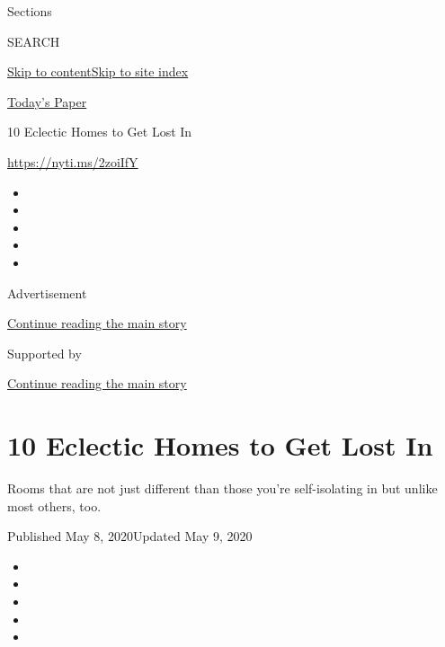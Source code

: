 Sections

SEARCH

\protect\hyperlink{site-content}{Skip to
content}\protect\hyperlink{site-index}{Skip to site index}

\href{https://myaccount.nytimes3xbfgragh.onion/auth/login?response_type=cookie\&client_id=vi}{}

\href{https://www.nytimes3xbfgragh.onion/section/todayspaper}{Today's
Paper}

10 Eclectic Homes to Get Lost In

\url{https://nyti.ms/2zoiIfY}

\begin{itemize}
\item
\item
\item
\item
\item
\end{itemize}

Advertisement

\protect\hyperlink{after-top}{Continue reading the main story}

Supported by

\protect\hyperlink{after-sponsor}{Continue reading the main story}

\hypertarget{10-eclectic-homes-to-get-lost-in}{%
\section{10 Eclectic Homes to Get Lost
In}\label{10-eclectic-homes-to-get-lost-in}}

Rooms that are not just different than those you're self-isolating in
but unlike most others, too.

Published May 8, 2020Updated May 9, 2020

\begin{itemize}
\item
\item
\item
\item
\item
\end{itemize}

